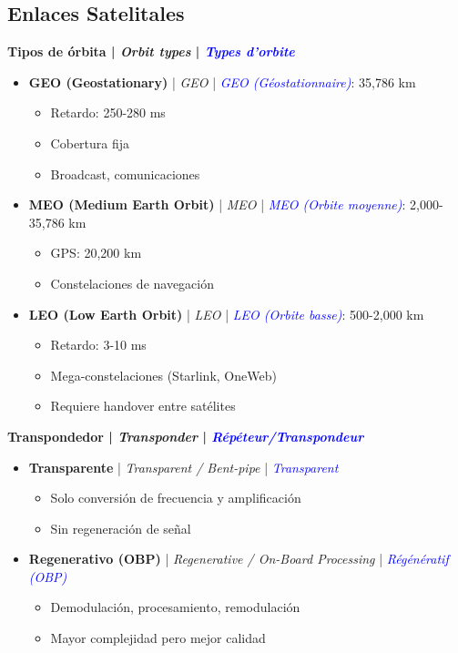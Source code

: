 \documentclass[a4paper,10pt]{article}
\begin{document}
\subsection{Enlaces Satelitales}

\textbf{Tipos de \'orbita | \textit{Orbit types} | \textcolor{blue}{\textit{Types d'orbite}}}

\begin{itemize}[leftmargin=*]
    \item \textbf{GEO (Geostationary)} | \textit{GEO} | \textcolor{blue}{\textit{GEO (G\'eostationnaire)}}: 35,786 km
    \begin{itemize}
        \item Retardo: 250-280 ms
        \item Cobertura fija
        \item Broadcast, comunicaciones
    \end{itemize}
    \item \textbf{MEO (Medium Earth Orbit)} | \textit{MEO} | \textcolor{blue}{\textit{MEO (Orbite moyenne)}}: 2,000-35,786 km
    \begin{itemize}
        \item GPS: 20,200 km
        \item Constelaciones de navegaci\'on
    \end{itemize}
    \item \textbf{LEO (Low Earth Orbit)} | \textit{LEO} | \textcolor{blue}{\textit{LEO (Orbite basse)}}: 500-2,000 km
    \begin{itemize}
        \item Retardo: 3-10 ms
        \item Mega-constelaciones (Starlink, OneWeb)
        \item Requiere handover entre sat\'elites
    \end{itemize}
\end{itemize}

\textbf{Transpondedor | \textit{Transponder} | \textcolor{blue}{\textit{R\'ep\'eteur/Transpondeur}}}

\begin{itemize}[leftmargin=*]
    \item \textbf{Transparente} | \textit{Transparent / Bent-pipe} | \textcolor{blue}{\textit{Transparent}}
    \begin{itemize}
        \item Solo conversión de frecuencia y amplificación
        \item Sin regeneraci\'on de se\~nal
    \end{itemize}
    \item \textbf{Regenerativo (OBP)} | \textit{Regenerative / On-Board Processing} | \textcolor{blue}{\textit{R\'eg\'en\'eratif (OBP)}}
    \begin{itemize}
        \item Demodulaci\'on, procesamiento, remodulaci\'on
        \item Mayor complejidad pero mejor calidad
    \end{itemize}
\end{itemize}
\end{document}
